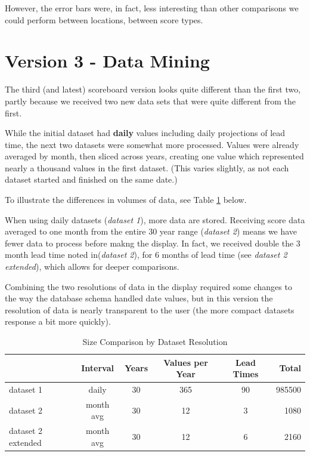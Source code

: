 \documentclass[logos,parttoc,morelanguage=french,morelanguage=german]{orsay-memoire}
\begin{document}
However, the error bars were, in fact, less interesting than other comparisons we could perform between locations, between score types.

\section{Version 3 - Data Mining}

The third (and latest) scoreboard version looks quite different than the first two, partly because we received two new data sets that were quite different from the first.

While the initial dataset had \textbf{daily} values including daily projections of lead time, the next two datasets were somewhat more processed. Values were already averaged by month, then sliced across years, creating one value which represented nearly a thousand values in the first dataset. (This varies slightly, as not each dataset started and finished on the same date.)

To illustrate the differences in volumes of data, see Table \ref{tbl:origDatasetCompare} below.

When using daily datasets (\textit{dataset 1}), more data are stored. Receiving score data averaged to one month from the entire 30 year range (\textit{dataset 2}) means we have fewer data to process before makng the display. In fact, we received double the 3 month lead time noted in(\textit{dataset 2}), for 6 months of lead time (see \textit{dataset 2 extended}), which allows for deeper comparisons.

Combining the two resolutions of data in the display required some changes to the way the database schema handled date values, but in this version the resolution of data is nearly transparent to the user (the more compact datasets response a bit more quickly).

\begin{table}[h]
\centering
\begin{tabular}{@{}lccccr@{}}
\toprule
 & Interval & Years & Values per Year & Lead Times & Total \\ \midrule
dataset 1 & daily & 30 & 365 & 90 & 985500 \\
dataset 2 & month avg & 30 & 12 & 3 & 1080 \\
dataset 2 extended & month avg & 30 & 12 & 6 & 2160 \\ \bottomrule
\end{tabular}
\caption{Size Comparison by Dataset Resolution}
\label{tbl:origDatasetCompare}
\end{table}
\end{document}
